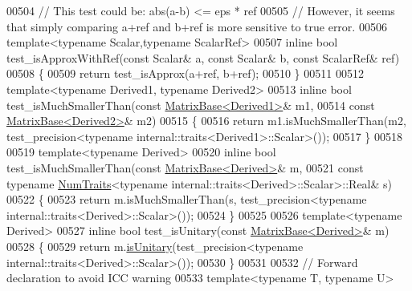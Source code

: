 \begin{DoxyCode}
00504 \textcolor{comment}{// This test could be: abs(a-b) <= eps * ref}
00505 \textcolor{comment}{// However, it seems that simply comparing a+ref and b+ref is more sensitive to true error.}
00506 \textcolor{keyword}{template}<\textcolor{keyword}{typename} Scalar,\textcolor{keyword}{typename} ScalarRef>
00507 \textcolor{keyword}{inline} \textcolor{keywordtype}{bool} test\_isApproxWithRef(\textcolor{keyword}{const} Scalar& a, \textcolor{keyword}{const} Scalar& b, \textcolor{keyword}{const} ScalarRef& ref)
00508 \{
00509   \textcolor{keywordflow}{return} test\_isApprox(a+ref, b+ref);
00510 \}
00511 
00512 \textcolor{keyword}{template}<\textcolor{keyword}{typename} Derived1, \textcolor{keyword}{typename} Derived2>
00513 \textcolor{keyword}{inline} \textcolor{keywordtype}{bool} test\_isMuchSmallerThan(\textcolor{keyword}{const} \hyperlink{group___core___module_class_eigen_1_1_matrix_base}{MatrixBase<Derived1>}& m1,
00514                                    \textcolor{keyword}{const} \hyperlink{group___core___module_class_eigen_1_1_matrix_base}{MatrixBase<Derived2>}& m2)
00515 \{
00516   \textcolor{keywordflow}{return} m1.isMuchSmallerThan(m2, test\_precision<\textcolor{keyword}{typename} internal::traits<Derived1>::Scalar>());
00517 \}
00518 
00519 \textcolor{keyword}{template}<\textcolor{keyword}{typename} Derived>
00520 \textcolor{keyword}{inline} \textcolor{keywordtype}{bool} test\_isMuchSmallerThan(\textcolor{keyword}{const} \hyperlink{group___core___module_class_eigen_1_1_matrix_base}{MatrixBase<Derived>}& m,
00521                                    \textcolor{keyword}{const} \textcolor{keyword}{typename} \hyperlink{group___core___module_struct_eigen_1_1_num_traits}{NumTraits}<\textcolor{keyword}{typename} 
      internal::traits<Derived>::Scalar>::Real& s)
00522 \{
00523   \textcolor{keywordflow}{return} m.isMuchSmallerThan(s, test\_precision<\textcolor{keyword}{typename} internal::traits<Derived>::Scalar>());
00524 \}
00525 
00526 \textcolor{keyword}{template}<\textcolor{keyword}{typename} Derived>
00527 \textcolor{keyword}{inline} \textcolor{keywordtype}{bool} test\_isUnitary(\textcolor{keyword}{const} \hyperlink{group___core___module_class_eigen_1_1_matrix_base}{MatrixBase<Derived>}& m)
00528 \{
00529   \textcolor{keywordflow}{return} m.\hyperlink{group___core___module_a8a7ee34ce202cac3eeea9cf20c9e4833}{isUnitary}(test\_precision<\textcolor{keyword}{typename} internal::traits<Derived>::Scalar>());
00530 \}
00531 
00532 \textcolor{comment}{// Forward declaration to avoid ICC warning}
00533 \textcolor{keyword}{template}<\textcolor{keyword}{typename} T, \textcolor{keyword}{typename} U>

\end{DoxyCode}
